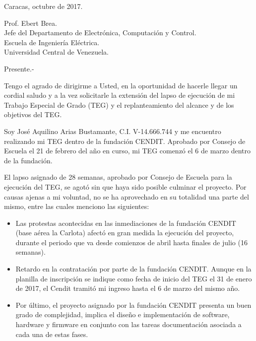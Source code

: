 \documentclass[paper=letter,oneside,fontsize=12pt, parskip=full]{article}
\begin{document}
	\begin{flushright}		
		\large
		Caracas, octubre de 2017. \\	
	\end{flushright}

	
	\begin{onehalfspace}
		\large
		Prof. Ebert Brea. \\
		Jefe del Departamento de Electrónica, Computación y Control. \\
		Escuela de Ingeniería Eléctrica. \\
		Universidad Central de Venezuela.	
	\end{onehalfspace}

	Presente.- 
	
	Tengo el agrado de dirigirme a Usted, en la oportunidad de hacerle llegar un cordial saludo y a la vez solicitarle la extensión del lapso de ejecución de mi Trabajo Especial de Grado (TEG) y el replanteamiento del alcance y de los objetivos del TEG.
	 
	Soy José Aquilino Arias Bustamante, C.I. V-14.666.744 y me encuentro realizando mi TEG dentro de la fundación CENDIT. Aprobado por Consejo de Escuela el 21 de febrero del año en curso, mi TEG comenzó el 6 de marzo dentro de la fundación.
	
	El lapso asignado de 28 semanas, aprobado por Consejo de Escuela para la ejecución del TEG, se agotó sin que haya sido posible culminar el proyecto. Por causas ajenas a mi voluntad, no se ha aprovechado en su totalidad una parte del mismo, entre las cuales menciono las siguientes:
	
	\begin{itemize}
		\item Las protestas acontecidas en las inmediaciones de la fundación CENDIT (base aérea la Carlota) afectó en gran medida la ejecución del proyecto, durante el periodo que va desde comienzos de abril hasta finales de julio (16 semanas).
	
		\item Retardo en la contratación por parte de la fundación CENDIT. Aunque en la planilla de inscripción se indique como fecha de inicio del TEG el 31 de enero de 2017, el Cendit tramitó mi ingreso hasta el 6 de marzo del mismo año. 
	
		\item Por último, el proyecto asignado por la fundación CENDIT presenta un buen grado de complejidad, implica el diseño e implementación de software, hardware y firmware en conjunto con las tareas documentación asociada a cada una de estas fases.
	\end{itemize}
	
\end{document}
